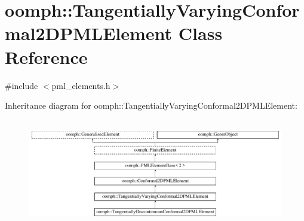 \hypertarget{classoomph_1_1TangentiallyVaryingConformal2DPMLElement}{}\section{oomph\+:\+:Tangentially\+Varying\+Conformal2\+D\+P\+M\+L\+Element Class Reference}
\label{classoomph_1_1TangentiallyVaryingConformal2DPMLElement}


{\ttfamily \#include $<$pml\+\_\+elements.\+h$>$}

Inheritance diagram for oomph\+:\+:Tangentially\+Varying\+Conformal2\+D\+P\+M\+L\+Element\+:\begin{figure}[H]
\begin{center}
\leavevmode
\includegraphics[height=4.745763cm]{classoomph_1_1TangentiallyVaryingConformal2DPMLElement}
\end{center}
\end{figure}
